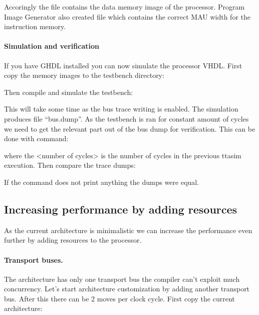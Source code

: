 \documentclass[twoside]{tceusermanual}
\begin{document}
Accoringly the file  contains the data
memory image of the processor. Program Image Generator also created file
 which contains the correct
MAU width for the instruction memory.

\paragraph{Simulation and verification}

If you have GHDL installed you can now simulate the processor VHDL. First
copy the memory images to the testbench directory:




Then compile and simulate the testbench:



This will take some time as the bus trace writing is enabled. The simulation
produces file ``bus.dump''. As the testbench is ran for constant amount of
cycles we need to get the relevant part out of the bus dump for
verification. This can be done with command:


where the <number of cycles> is the number of cycles in the previous ttasim
execution. Then compare the trace dumps:


If the command does not print anything the dumps were equal.


\subsection{Increasing performance by adding resources}

As the current architecture is minimalistic we can increase the performance
even further by adding resources to the processor.

\paragraph{Transport buses.} 
The architecture has only one transport bus the compiler can't exploit much
concurrency. Let's start architecture customization by adding another
transport bus. After this there can be 2 moves per clock cycle. First copy
the current architecture:
\end{document}
